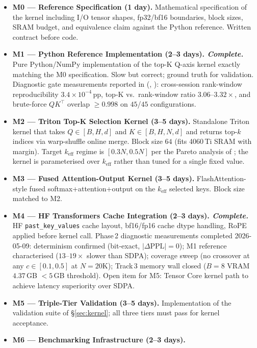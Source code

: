\documentclass[11pt]{article}
\theoremstyle{definition}
\theoremstyle{remark}
\theoremstyle{plain}
\begin{document}
\begin{itemize}\setlength\itemsep{1pt}
  \item \textbf{M0 — Reference Specification (1 day).}
    Mathematical specification of the kernel including I/O tensor shapes, fp32/bf16
    boundaries, block sizes, SRAM budget, and equivalence claim against the Python
    reference. Written contract before code.
  \item \textbf{M1 — Python Reference Implementation (2--3 days). \emph{Complete.}}
    Pure Python/NumPy implementation of the top-K Q-axis kernel exactly matching
    the M0 specification. Slow but correct; ground truth for validation. Diagnostic
    gate measurements reported in  (, ):
    cross-session rank-window reproducibility $3.4\times 10^{-4}\,$pp, top-K vs.\ rank-window
    ratio $3.06$--$3.32\times$, and brute-force $QK^\top$ overlap $\geq 0.998$ on
    $45$/$45$ configurations.
  \item \textbf{M2 — Triton Top-K Selection Kernel (3--5 days).}
    Standalone Triton kernel that takes $Q\in[B,H,d]$ and $K\in[B,H,N,d]$ and
    returns top-$k$ indices via warp-shuffle online merge. Block size $64$
    (fits 4060\,Ti SRAM with margin). Target $k_\text{eff}$ regime is
    $[0.3N, 0.5N]$ per the Pareto analysis of ; the kernel is
    parameterised over $k_\text{eff}$ rather than tuned for a single fixed
    value.
  \item \textbf{M3 — Fused Attention-Output Kernel (3--5 days).}
    FlashAttention-style fused softmax+attention+output on the $k_\text{eff}$
    selected keys. Block size matched to M2.
  \item \textbf{M4 — HF Transformers Cache Integration (2--3 days). \emph{Complete.}}
    HF \texttt{past\_key\_values} cache layout, bf16/fp16 cache dtype handling,
    RoPE applied before kernel call.
    Phase\,2 diagnostic measurements completed 2026-05-09: determinism confirmed
    (bit-exact, $|\Delta\mathrm{PPL}|\!=\!0$); M1 reference characterised
    ($13$--$19\times$ slower than SDPA); coverage sweep (no crossover at any
    $c\!\in\![0.1,0.5]$ at $N\!=\!20\text{K}$); Track\,3 memory wall closed
    ($B\!=\!8$ VRAM $4.37$\,GB $<5$\,GB threshold).
    Open item for M5: Tensor Core kernel path to achieve latency superiority over SDPA.
  \item \textbf{M5 — Triple-Tier Validation (3--5 days).}
    Implementation of the validation suite of §\ref{sec:kernel}; all three tiers
    must pass for kernel acceptance.
  \item \textbf{M6 — Benchmarking Infrastructure (2--3 days).}

\end{itemize}
\end{document}
